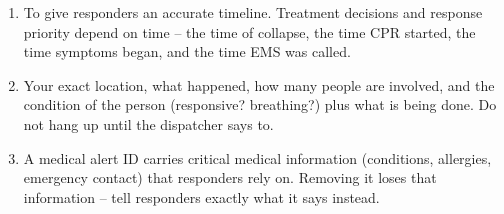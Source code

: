 \begin{enumerate}[leftmargin=*]
\item To give responders an accurate timeline. Treatment decisions and response priority depend on time -- the time of collapse, the time CPR started, the time symptoms began, and the time EMS was called.
\item Your exact location, what happened, how many people are involved, and the condition of the person (responsive? breathing?) plus what is being done. Do not hang up until the dispatcher says to.
\item A medical alert ID carries critical medical information (conditions, allergies, emergency contact) that responders rely on. Removing it loses that information -- tell responders exactly what it says instead.
\end{enumerate}
